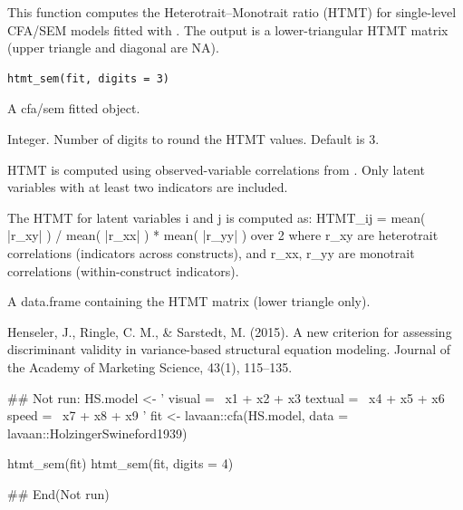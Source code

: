 \documentclass[a4paper]{book}
\begin{document}
%
\begin{Description}
This function computes the Heterotrait–Monotrait ratio (HTMT)
for single-level CFA/SEM models fitted with .
The output is a lower-triangular HTMT matrix (upper triangle and diagonal are NA).
\end{Description}
%
\begin{Usage}
\begin{verbatim}
htmt_sem(fit, digits = 3)
\end{verbatim}
\end{Usage}
%
\begin{Arguments}
\begin{ldescription}
\item[\code{fit}] A  cfa/sem fitted object.

\item[\code{digits}] Integer. Number of digits to round the HTMT values. Default is 3.
\end{ldescription}
\end{Arguments}
%
\begin{Details}
HTMT is computed using observed-variable correlations from
.
Only latent variables with at least two indicators are included.

The HTMT for latent variables i and j is computed as:
HTMT\_ij = mean( |r\_xy| ) /  mean( |r\_xx| ) * mean( |r\_yy| )  over 2
where r\_xy are heterotrait correlations (indicators across constructs),
and r\_xx, r\_yy are monotrait correlations (within-construct indicators).
\end{Details}
%
\begin{Value}
A data.frame containing the HTMT matrix (lower triangle only).
\end{Value}
%
\begin{References}
Henseler, J., Ringle, C. M., \& Sarstedt, M. (2015).
A new criterion for assessing discriminant validity in variance-based
structural equation modeling. Journal of the Academy of Marketing Science,
43(1), 115–135.
\end{References}
%
\begin{Examples}
\begin{ExampleCode}
## Not run: 
HS.model <- '
  visual  =~ x1 + x2 + x3
  textual =~ x4 + x5 + x6
  speed   =~ x7 + x8 + x9
'
fit <- lavaan::cfa(HS.model, data = lavaan::HolzingerSwineford1939)

htmt_sem(fit)
htmt_sem(fit, digits = 4)

## End(Not run)
\end{ExampleCode}
\end{Examples}
\end{document}
